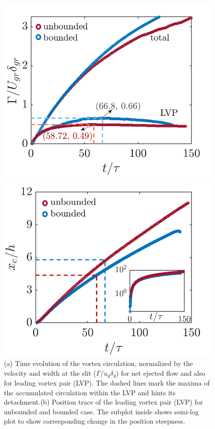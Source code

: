 \documentclass[final,3p,10pt,times,review,authoryear]{elsarticle}
\begin{document}
	\begin{figure}
		\centering
		\begin{minipage}[c]{0.46\linewidth}
			\centering
			\includegraphics[width=1\linewidth] {Figures/Circ_S1.png} 
		\end{minipage}
		\begin{minipage}[c]{0.495\linewidth}
		\centering
		\includegraphics[width=1\linewidth] {Figures/velocity.png} 
	\end{minipage}
		\caption{(a) Time evolution of the vortex circulation, normalized by the velocity and width at the slit ($\Gamma$/$u_g\delta_g$) for net ejected flow and also for leading vortex pair (LVP). The dashed lines mark the maxima of the accumulated circulation within the LVP and hints its detachment.(b) Position trace of the leading vortex pair (LVP) for unbounded and bounded case. The subplot inside shows semi-log plot to show corresponding change in the position steepness.}
		\label{fig:Circ_S1_vs_T}
	\end{figure}
\end{document}
